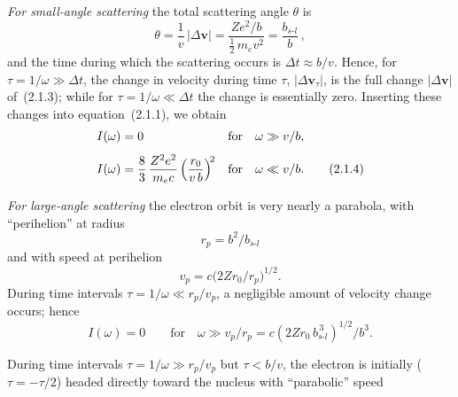 \textit{For small-angle scattering} the total scattering angle $\theta$ is
%
\begin{equation}
\theta = \frac{1}{v}\, |\Delta \mathbf{v}|
      = \frac{Ze^2/b}{\frac{1}{2}\, m_e v^2}
      = \frac{b_{s\text{-}l}}{b}\,,
\tag{2.1.3}
\end{equation}
%
and the time during which the scattering occurs is $\Delta t \approx b/v$.  Hence, for
$\tau = 1/\omega \gg \Delta t$, the change in velocity during time $\tau$, $|\Delta \mathbf{v}_\tau|$,
is the full change $|\Delta \mathbf{v}|$ of~(2.1.3); while for $\tau = 1/\omega \ll \Delta t$ the change is
essentially zero.  Inserting these changes into equation~(2.1.1), we obtain
%
\begin{align}
I(\omega) &= 0  &\text{for}&\quad \omega \gg v/b, \notag \\[4pt]
I(\omega) &= \frac{8}{3}\,\frac{Z^2 e^2}{m_e c}\left(\frac{r_0}{v\,b}\right)^{\!2}
           &\text{for}&\quad \omega \ll v/b.
\tag{2.1.4}
\end{align}

\textit{For large-angle scattering} the electron orbit is very nearly a parabola, with
``perihelion'' at radius
%
\begin{equation}
r_p = b^2 / b_{s\text{-}l}
\tag{2.1.5a}
\end{equation}
%
and with speed at perihelion
%
\begin{equation}
v_p = c\bigl(2 Z r_0 / r_p\bigr)^{1/2}.
\tag{2.1.5b}
\end{equation}
%
During time intervals $\tau = 1/\omega \ll r_p/v_p$, a negligible amount of velocity change
occurs; hence
%
\begin{equation}
I(\omega) = 0 \qquad \text{for}\quad \omega \gg v_p/r_p
           = c(2Zr_0\, b_{s\text{-}l}^{\,3})^{1/2}/b^3.
\tag{2.1.6a}
\end{equation}

During time intervals $\tau = 1/\omega \gg r_p/v_p$ but $\tau < b/v$, the electron is initially
($\tau = -\tau/2$) headed directly toward the nucleus with ``parabolic'' speed

